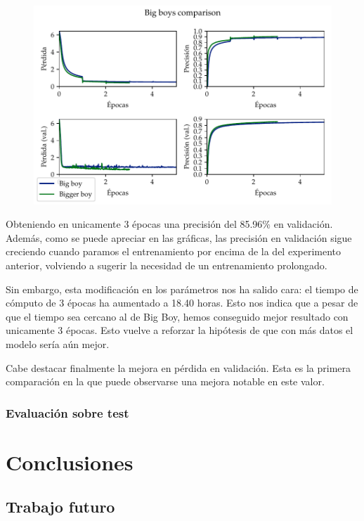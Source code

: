 \documentclass[a4paper, 20pt, dvipsnames]{article}
\begin{document}
\begin{figure}[H]
	\centering
	\includegraphics{fig/bigboys.pdf}
\end{figure}

Obteniendo en unicamente 3 épocas una precisión del 85.96\% en
validación. Además, como se puede apreciar en las gráficas, las precisión en
validación sigue creciendo cuando paramos el entrenamiento por encima de la del
experimento anterior, volviendo a sugerir la necesidad de un entrenamiento
prolongado.

Sin embargo, esta modificación en los parámetros nos ha salido cara: el tiempo
de cómputo de 3 épocas ha aumentado a 18.40 horas. Esto nos indica que a pesar
de que el tiempo sea cercano al de Big Boy, hemos conseguido mejor resultado con
unicamente 3 épocas. Esto vuelve a reforzar la hipótesis de que con más datos el
modelo sería aún mejor.

Cabe destacar finalmente la mejora en pérdida en validación. Esta es la primera
comparación en la que puede observarse una mejora notable en este valor.


\subsubsection{Evaluación sobre test}

\section{Conclusiones}

\subsection{Trabajo futuro}
\end{document}
